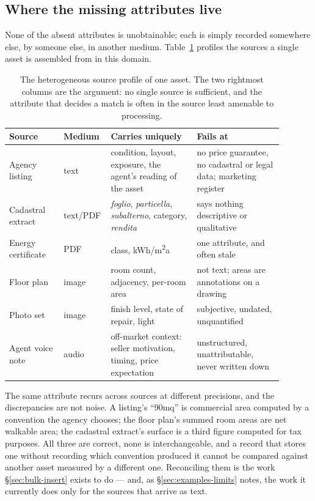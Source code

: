 \subsection{Where the missing attributes live}
\label{sec:examples-source-fan-in}

None of the absent attributes is unobtainable; each is simply recorded somewhere else, by someone else, in another medium. Table~\ref{tab:source-profile} profiles the sources a single asset is assembled from in this domain.

\begin{table}[htbp]
\centering
\small
\begin{tabular}{p{0.19\linewidth}p{0.10\linewidth}p{0.30\linewidth}p{0.30\linewidth}}
\hline
\textbf{Source} & \textbf{Medium} & \textbf{Carries uniquely} & \textbf{Fails at} \\
\hline
\footnotesize{Agency listing} & text & condition, layout, exposure, the agent's reading of the asset & no price guarantee, no cadastral or legal data; marketing register \\
\footnotesize{Cadastral extract} & text/PDF & \emph{foglio}, \emph{particella}, \emph{subalterno}, category, \emph{rendita} & says nothing descriptive or qualitative \\
\footnotesize{Energy certificate} & PDF & class, kWh/m\textsuperscript{2}a & one attribute, and often stale \\
\footnotesize{Floor plan} & image & room count, adjacency, per-room area & not text; areas are annotations on a drawing \\
\footnotesize{Photo set} & image & finish level, state of repair, light & subjective, undated, unquantified \\
\footnotesize{Agent voice note} & audio & off-market context: seller motivation, timing, price expectation & unstructured, unattributable, never written down \\
\hline
\end{tabular}
\caption{The heterogeneous source profile of one asset. The two rightmost columns are the argument: no single source is sufficient, and the attribute that decides a match is often in the source least amenable to processing.}
\label{tab:source-profile}
\end{table}

The same attribute recurs across sources at different precisions, and the discrepancies are not noise. A listing's ``90mq'' is commercial area computed by a convention the agency chooses; the floor plan's summed room areas are net walkable area; the cadastral extract's surface is a third figure computed for tax purposes. All three are correct, none is interchangeable, and a record that stores one without recording which convention produced it cannot be compared against another asset measured by a different one. Reconciling them is the work \S\ref{sec:bulk-insert} exists to do --- and, as \S\ref{sec:examples-limits} notes, the work it currently does only for the sources that arrive as text.

